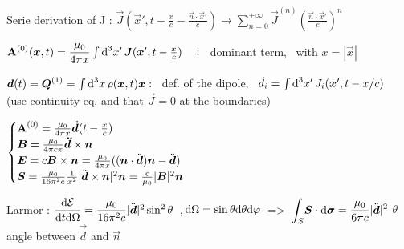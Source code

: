 
\begin{squishlist}
\item Serie derivation of J : $ \vec{J}(\vec{x}', t - \frac{x}{c} - \frac{\vec{n}\cdot\vec{x}'}{c}) \rightarrow \sum_{n=0}^{+\infty} \vec{J}^{(n)} \left(\frac{\vec{n}\cdot\vec{x}'}{c}\right)^n$

\item $\vec{\rm{A}}^{(0)}(\vec{x},t) = \dfrac{\mu_0}{4\pi x} \int \ud ^3x' \, \vec{J}(\vec{x}', t-\frac{x}{c}) \quad :$ \,  dominant term, \, with $x = |\vec{x}|$

\item $\vec{d}(t) = \vec{Q}^{(1)} = \int \ud ^3x \, \rho(\vec{x},t)\vec{x}  :$ \, def. of the dipole, \, $\dot{d}_i = \int \ud ^3x' \, J_i(\vec{x}',t-x/c)$ \, (use continuity eq. and that $\vec{J}=0$ at the boundaries)

\item$        \begin{cases}
\vec{\rm{A}}^{(0)} = \frac{\mu_0}{4\pi x}{\vec{\dot{{d}}}}(t-\frac{x}{c}) \\
\vec{B} =\frac{\mu_0}{4\pi c x} \vec{\ddot{{d}}} \times \vec{n} \\
\vec{E} = c\vec{B} \times \vec{n} = \frac{\mu_0}{4 \pi x} ((\vec{n}\cdot \ddot{\vec{d}})\vec{n} - \ddot{\vec{d}})\\
\vec{S} = \frac{\mu_0}{16\pi^2c}\frac{1}{x^2} |\ddot{\vec{d}} \times \vec{n}|^2\vec{n} = \frac{c}{\mu_0} |\vec{B}|^2\vec{n}
\end{cases} $

\item Larmor : $\dfrac{\ud \E}{\ud t\ud \Omega} = \dfrac{\mu_0}{16\pi^2c}|\ddot{\vec{d}}|^2\sin^2\theta$ \,,$\,\ud \Omega = \sin\theta\ud \theta\ud \varphi \, $ => $\, \displaystyle{\int_{S}} \vec{S}\cdot\vec{\ud \sigma} = \dfrac{\mu_0}{6\pi c} |\ddot{\vec{d}}|^2$  $\theta$ angle between $ \vec{\ddot{d}}$ and $ \vec{n}$
\end{squishlist}

